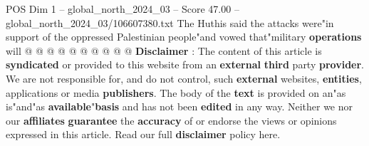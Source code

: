 \begin{textsample}{POS Dim 1 – global\_north\_2024\_03 – Score 47.00 – global\_north\_2024\_03/106607380.txt}
The Huthis said the attacks were"in support of the oppressed Palestinian people"and vowed that"military \textbf{operations} will @ @ @ @ @ @ @ @ @ @ \textbf{Disclaimer} : The content of this article is \textbf{syndicated} or provided to this website from an \textbf{external} \textbf{third} party \textbf{provider}.
We are not responsible for, and do not control, such \textbf{external} websites, \textbf{entities}, applications or media \textbf{publishers}.
The body of the \textbf{text} is provided on an"as is"and"as \textbf{available}"\textbf{basis} and has not been \textbf{edited} in any way.
Neither we nor our \textbf{affiliates} \textbf{guarantee} the \textbf{accuracy} of or endorse the views or opinions expressed in this article.
Read our full \textbf{disclaimer} policy here.

\end{textsample}
